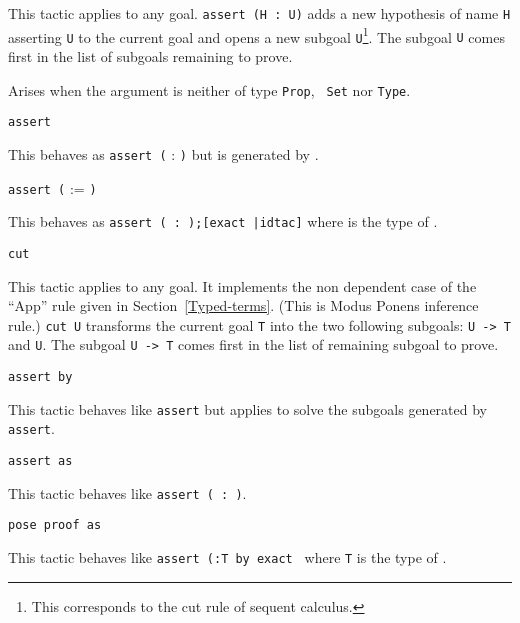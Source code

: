 This tactic applies to any goal. {\tt assert (H : U)} adds a new
hypothesis of name \texttt{H} asserting \texttt{U} to the current goal
and opens a new subgoal \texttt{U}\footnote{This corresponds to the
  cut rule of sequent calculus.}. The subgoal {\texttt U} comes first
in the list of subgoals remaining to prove.

\begin{ErrMsgs}
\item {}
  
  Arises when the argument {\form} is neither of type {\tt Prop}, {\tt
    Set} nor {\tt Type}.

\end{ErrMsgs}

\begin{Variants}

\item{\tt assert {\form}}
  
  This behaves as {\tt assert (} {\ident} : {\form} {\tt )} but
  {\ident} is generated by {\Coq}.

\item{\tt assert (} {\ident} := {\term} {\tt )}
  
  This behaves as {\tt assert ({\ident} : {\type});[exact
    {\term}|idtac]} where {\type} is the type of {\term}.

\item {\tt cut {\form}} 
  
  This tactic applies to any goal. It implements the non dependent
  case of the ``App'' rule given in
  Section~\ref{Typed-terms}. (This is Modus Ponens inference rule.)
  {\tt cut U} transforms the current goal \texttt{T} into the two
  following subgoals: {\tt U -> T} and \texttt{U}.  The subgoal {\tt U
    -> T} comes first in the list of remaining subgoal to prove.

\item \texttt{assert {\form} by {\tac}}
  
  This tactic behaves like \texttt{assert} but applies {\tac}
  to solve the subgoals generated by \texttt{assert}.

\item \texttt{assert {\form} as {\ident}}

   This tactic behaves like \texttt{assert ({\ident} : {\form})}.

\item \texttt{pose proof {\term} as {\ident}}

  This tactic behaves like \texttt{assert ({\ident:T} by exact {\term}} where
  \texttt{T} is the type of {\term}. 

\end{Variants}

